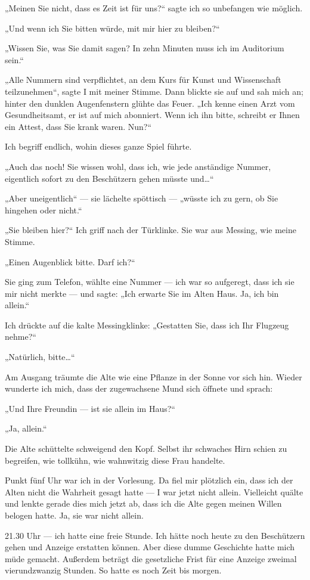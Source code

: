 „Meinen Sie nicht, dass es Zeit ist für uns?“ sagte ich so
unbefangen wie möglich.

„Und wenn ich Sie bitten würde, mit mir hier zu bleiben?“

„Wissen
Sie, was Sie damit sagen? In zehn Minuten muss ich im Auditorium
sein.“

„Alle Nummern sind verpflichtet, an dem Kurs für Kunst und
Wissenschaft teilzunehmen“, sagte I mit meiner Stimme. Dann blickte
sie auf und sah mich an; hinter den dunklen Augenfenstern glühte
das Feuer. „Ich kenne einen Arzt vom Gesundheitsamt, er ist auf
mich abonniert. Wenn ich ihn bitte, schreibt er Ihnen ein Attest,
dass Sie krank waren. Nun?“

Ich begriff endlich, wohin dieses ganze
Spiel führte.

„Auch das noch! Sie wissen wohl, dass ich, wie jede
anständige Nummer, eigentlich sofort zu den Beschützern gehen
müsste und\ldots{}“

„Aber uneigentlich“ — sie lächelte spöttisch — „wüsste ich zu gern,
ob Sie hingehen oder nicht.“

„Sie bleiben hier?“ Ich griff nach der
Türklinke. Sie war aus Messing, wie meine Stimme.

„Einen Augenblick bitte. Darf ich?“

Sie ging zum Telefon, wählte eine Nummer — ich war so aufgeregt,
dass ich sie mir nicht merkte — und sagte: „Ich erwarte Sie im
Alten Haus. Ja, ich bin allein.“

Ich drückte auf die kalte
Messingklinke: „Gestatten Sie, dass ich Ihr Flugzeug nehme?“

„Natürlich, bitte\ldots{}“

Am Ausgang träumte die Alte wie eine Pflanze in der Sonne vor sich
hin. Wieder wunderte ich mich, dass der zugewachsene Mund sich
öffnete und sprach:

„Und Ihre Freundin — ist sie allein im Haus?“

„Ja, allein.“

Die Alte schüttelte schweigend den Kopf. Selbst ihr schwaches Hirn
schien zu begreifen, wie tollkühn, wie wahnwitzig diese Frau
handelte.

Punkt fünf Uhr war ich in der Vorlesung. Da fiel mir plötzlich ein,
dass ich der Alten nicht die Wahrheit gesagt hatte — I war jetzt
nicht allein. Vielleicht quälte und lenkte gerade dies mich jetzt
ab, dass ich die Alte gegen meinen Willen belogen hatte. Ja, sie
war nicht allein.

21.30 Uhr — ich hatte eine freie Stunde. Ich hätte noch heute zu
den Beschützern gehen und Anzeige erstatten können. Aber diese
dumme Geschichte hatte mich müde gemacht. Außerdem beträgt die
gesetzliche Frist für eine Anzeige zweimal vierundzwanzig Stunden.
So hatte es noch Zeit bis morgen.

